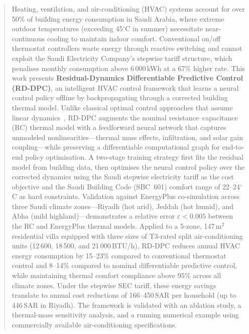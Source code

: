 \documentclass[12pt]{article}
\theoremstyle{plain}
\theoremstyle{definition}
\begin{document}
\begin{abstract}

\noindent Heating, ventilation, and air-conditioning (HVAC) systems account for over 50\% of building energy consumption in Saudi Arabia, where extreme outdoor temperatures (exceeding 45$^\circ$C in summer) necessitate near-continuous cooling to maintain indoor comfort. Conventional on/off thermostat controllers waste energy through reactive switching and cannot exploit the Saudi Electricity Company's stepwise tariff structure, which penalises monthly consumption above 6\,000\,kWh at a 67\% higher rate. This work presents \textbf{Residual-Dynamics Differentiable Predictive Control (RD-DPC)}, an intelligent HVAC control framework that learns a neural control policy offline by backpropagating through a corrected building thermal model. Unlike classical optimal control approaches that assume linear dynamics~\cite{mousa2018optimal}, RD-DPC augments the nominal resistance--capacitance (RC) thermal model with a feedforward neural network that captures unmodeled nonlinearities---thermal mass effects, infiltration, and solar gain coupling---while preserving a differentiable computational graph for end-to-end policy optimisation. A two-stage training strategy first fits the residual model from building data, then optimises the neural control policy over the corrected dynamics using the Saudi stepwise electricity tariff as the cost objective and the Saudi Building Code (SBC~601) comfort range of 22--24$^\circ$C as hard constraints. Validation against EnergyPlus co-simulation across three Saudi climate zones---Riyadh (hot arid), Jeddah (hot humid), and Abha (mild highland)---demonstrates a relative error $\varepsilon < 0.005$ between the RC and EnergyPlus thermal models. Applied to a 5-zone, 147\,m$^2$ residential villa equipped with three sizes of T3-rated split air-conditioning units (12\,600, 18\,500, and 21\,000\,BTU/h), RD-DPC reduces annual HVAC energy consumption by 15--23\% compared to conventional thermostat control and 8--14\% compared to nominal differentiable predictive control, while maintaining thermal comfort compliance above 95\% across all climate zones. Under the stepwise SEC tariff, these energy savings translate to annual cost reductions of 166--450\,SAR per household (up to 446\,SAR in Riyadh). The framework is validated with an ablation study, a thermal-mass sensitivity analysis, and a running numerical example using commercially available air-conditioning specifications.
\end{abstract}
\end{document}
